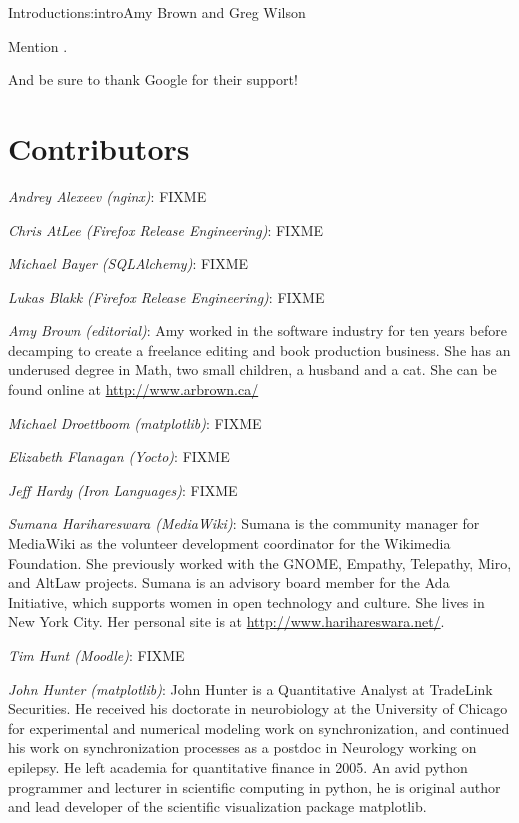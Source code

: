 \begin{aosachapter}{Introduction}{s:intro}{Amy Brown and Greg Wilson}

Mention \cite{bib:aosa1}.

And be sure to thank Google for their support!

\section*{Contributors}

\emph{Andrey Alexeev (nginx)}: FIXME

\emph{Chris AtLee (Firefox Release Engineering)}: FIXME

\emph{Michael Bayer (SQLAlchemy)}: FIXME

\emph{Lukas Blakk (Firefox Release Engineering)}: FIXME

\emph{Amy Brown (editorial)}: Amy worked in the software industry for
ten years before decamping to create a freelance editing and book production
business. She has an underused degree in Math, two small children, a
husband and a cat. She can be found online at \url{http://www.arbrown.ca/}

\emph{Michael Droettboom (matplotlib)}: FIXME

\emph{Elizabeth Flanagan (Yocto)}: FIXME

\emph{Jeff Hardy (Iron Languages)}: FIXME

\emph{Sumana Harihareswara (MediaWiki)}: Sumana is the community manager for
MediaWiki as the volunteer development coordinator for the Wikimedia
Foundation. She previously worked with the GNOME, Empathy, Telepathy,
Miro, and AltLaw projects. Sumana is an advisory board member for the
Ada Initiative, which supports women in open technology and culture.
She lives in New York City. Her personal site is at
\url{http://www.harihareswara.net/}.

\emph{Tim Hunt (Moodle)}: FIXME

\emph{John Hunter (matplotlib)}: John Hunter is a Quantitative Analyst
at TradeLink Securities.  He received his doctorate in neurobiology at
the University of Chicago for experimental and numerical modeling work
on synchronization, and continued his work on synchronization
processes as a postdoc in Neurology working on epilepsy. He left
academia for quantitative finance in 2005.  An avid python programmer
and lecturer in scientific computing in python, he is original author
and lead developer of the scientific visualization package matplotlib.


\end{aosachapter}
